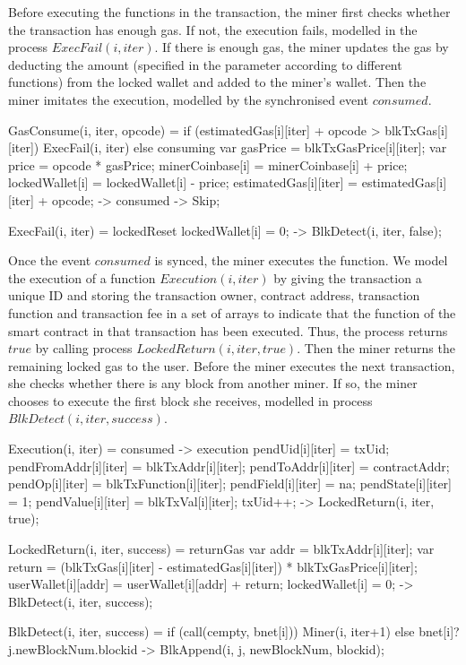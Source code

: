 \documentclass{KERauth}
\begin{document}
Before executing the functions in the transaction, the miner first checks whether the transaction has enough gas. If not, the execution fails, modelled in the process $ExecFail(i, iter)$. If there is enough gas, the miner updates the gas by deducting the amount (specified in the parameter according to different functions) from the locked wallet and added to the miner's wallet. Then the miner imitates the execution, modelled by the synchronised event $consumed$.
\begin{center}
\begin{boxedverbatim}
GasConsume(i, iter, opcode) =
  if (estimatedGas[i][iter] + opcode > blkTxGas[i][iter]) {
		ExecFail(i, iter)}
  else {
    consuming{
      var gasPrice = blkTxGasPrice[i][iter];
      var price = opcode * gasPrice;
      minerCoinbase[i] = minerCoinbase[i] + price;
      lockedWallet[i] = lockedWallet[i] - price;
      estimatedGas[i][iter] = estimatedGas[i][iter] + opcode;} ->
      consumed ->
      Skip};

ExecFail(i, iter) =
  lockedReset{ lockedWallet[i] = 0;} ->
  BlkDetect(i, iter, false);
\end{boxedverbatim}
\end{center}

Once the event $consumed$ is synced, the miner executes the function. We model the execution of a function $Execution(i, iter)$ by giving the transaction a unique ID and storing the transaction owner, contract address, transaction function and transaction fee in a set of arrays to indicate that the function of the smart contract in that transaction has been executed. Thus, the process returns $true$ by calling process $LockedReturn(i, iter, true)$. Then the miner returns the remaining locked gas to the user. Before the miner executes the next transaction, she checks whether there is any block from another miner. If so, the miner chooses to execute the first block she receives, modelled in process $BlkDetect(i, iter, success)$.
\begin{center}
\begin{boxedverbatim}
Execution(i, iter) = consumed ->
                     execution{
                       pendUid[i][iter] = txUid;
                       pendFromAddr[i][iter] = blkTxAddr[i][iter];
                       pendToAddr[i][iter] = contractAddr;
                       pendOp[i][iter] = blkTxFunction[i][iter];
                       pendField[i][iter] = na;
                       pendState[i][iter] = 1;
                       pendValue[i][iter] = blkTxVal[i][iter];
                       txUid++;} ->
                     LockedReturn(i, iter, true);

LockedReturn(i, iter, success) =
  returnGas{
    var addr = blkTxAddr[i][iter];
    var return = (blkTxGas[i][iter] - estimatedGas[i][iter]) * blkTxGasPrice[i][iter];
    userWallet[i][addr] = userWallet[i][addr] + return;
    lockedWallet[i] = 0; } ->
  BlkDetect(i, iter, success);

BlkDetect(i, iter, success) =
  if (call(cempty, bnet[i])) {Miner(i, iter+1)}
  else {bnet[i]?j.newBlockNum.blockid -> BlkAppend(i, j, newBlockNum, blockid)};
\end{boxedverbatim}
\end{center}
\end{document}
